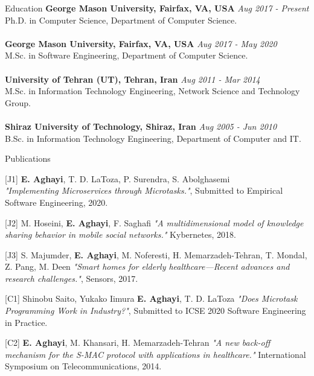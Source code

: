 \documentclass{resume} %
\begin{document}

\begin{rSection}{Education}
{\bf  George Mason University, Fairfax, VA, USA} \hfill {\em Aug 2017 - Present} 
\\ Ph.D. in Computer Science, Department of Computer Science.\\
\\{\bf  George Mason University, Fairfax, VA, USA} \hfill {\em Aug 2017 - May 2020} 
\\ M.Sc. in Software Engineering, Department of Computer Science.\\
\\{\bf University of Tehran (UT), Tehran, Iran } \hfill {\em Aug 2011 - Mar 2014} 
\\ M.Sc. in Information Technology Engineering, Network Science and Technology Group.\\
\\{\bf Shiraz University of Technology, Shiraz, Iran } \hfill {\em Aug 2005 - Jun 2010} 
\\ B.Sc. in Information Technology Engineering, Department of Computer and IT.


\end{rSection}


\begin{rSection}{Publications}

\item [{[J1]}]\textbf{E. Aghayi}, T. D. LaToza, P. Surendra, S. Abolghasemi \\  \textit{"Implementing Microservices through Microtasks."}, Submitted to Empirical Software Engineering, 2020.\\
\item [{[J2]}] M. Hoseini, \textbf{E. Aghayi}, F. Saghafi \textit{"A multidimensional model of knowledge sharing behavior in mobile social networks."} Kybernetes, 2018.\\
\item [{[J3]}] S. Majumder, \textbf{E. Aghayi}, M. Noferesti, H. Memarzadeh-Tehran, T. Mondal, Z. Pang, M. Deen \textit{"Smart homes for elderly healthcare—Recent advances and research challenges."}, Sensors, 2017.\\
\item [{[C1]}] Shinobu Saito, Yukako Iimura \textbf{E. Aghayi}, T. D. LaToza \textit{"Does Microtask Programming Work in Industry?"}, Submitted to ICSE 2020 Software Engineering in Practice.\\
\item [{[C2]}] \textbf{E. Aghayi}, M. Khansari, H. Memarzadeh-Tehran \textit{"A new back-off mechanism for the S-MAC protocol with applications in healthcare."} International Symposium on Telecommunications, 2014.
\end{rSection}
\end{document}
